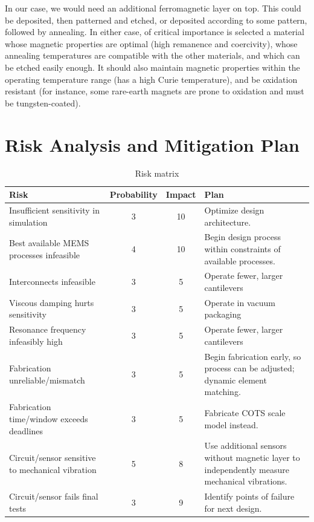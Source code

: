 In our case, we would need an additional ferromagnetic layer on top. This could be deposited, then patterned and etched, or deposited according to some pattern, followed by annealing. In either case, of critical importance is selected a material whose magnetic properties are optimal (high remanence and coercivity), whose annealing temperatures are compatible with the other materials, and which can be etched easily enough. It should also maintain magnetic properties within the operating temperature range (has a high Curie temperature), and be oxidation resistant (for instance, some rare-earth magnets are prone to oxidation and must be tungsten-coated).

\section{Risk Analysis and Mitigation Plan}

\begin{table}[h!]
\centering
\begin{tabularx}{.85\textwidth}{|X||c|c|X|}
    \hline
    Risk & Probability & Impact & Plan\\
    \hline
    \hline
    Insufficient sensitivity in simulation & 3 & 10 & Optimize design architecture. \\
    \hline
    Best available MEMS processes infeasible & 4 & 10 & Begin design process within constraints of available processes. \\
    \hline
    Interconnects infeasible & 3 & 5 & Operate fewer, larger cantilevers \\
    \hline
    Viscous damping hurts sensitivity & 3 & 5 & Operate in vacuum packaging \\
    \hline
    Resonance frequency infeasibly high & 3  & 5 & Operate fewer, larger cantilevers \\
    \hline
    Fabrication unreliable/mismatch & 3 & 5 & Begin fabrication early, so process can be adjusted; dynamic element matching. \\
    \hline
    Fabrication time/window exceeds deadlines & 3 & 5 & Fabricate COTS scale model instead. \\
    \hline
    Circuit/sensor sensitive to mechanical vibration & 5 & 8 & Use additional sensors without magnetic layer to independently measure mechanical vibrations. \\
    \hline
    Circuit/sensor fails final tests & 3 & 9 & Identify points of failure for next design. \\
    \hline
\end{tabularx}
\caption{Risk matrix}
\label{table:risk}
\end{table}

